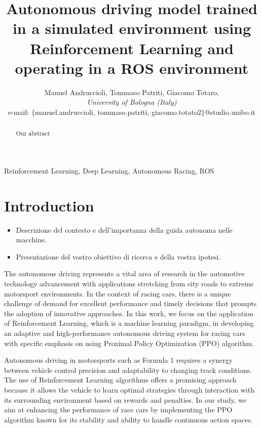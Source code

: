 \documentclass[conference]{IEEEtran}
\begin{document}
\title{
    Autonomous driving model trained in a simulated environment using Reinforcement Learning and operating in a ROS environment
}

\author{Manuel Andruccioli,
Tommaso Patriti,
Giacomo Totaro,\\ 
\textit{University of Bologna (Italy)} \\
e-mail: $\{$manuel.andruccioli, tommaso.patriti, giacomo.totato2$\}$@studio.unibo.it }

\maketitle

\begin{abstract}
Our abstract
\end{abstract}

\begin{IEEEkeywords}
    Reinforcement Learning, Deep Learning, Autonomous Racing, ROS
\end{IEEEkeywords}

\section{Introduction}

\begin{itemize}
    \item Descrizione del contesto e dell'importanza della guida autonoma nelle macchine.

    \item Presentazione del vostro obiettivo di ricerca e della vostra ipotesi.

\end{itemize}

The autonomous driving represents a vital area of research in the automotive technology advancement with applications stretching from city roads to extreme motorsport environments. In the context of racing cars, there is a unique challenge of demand for excellent performance and timely decisions that prompts the adoption of innovative approaches. In this work, we focus on the application of Reinforcement Learning, which is a machine learning paradigm, in developing an adaptive and high-performance autonomous driving system for racing cars with specific emphasis on using Proximal Policy Optimization (PPO) algorithm.

Autonomous driving in motorsports such as Formula 1 requires a synergy between vehicle control precision and adaptability to changing track conditions. The use of Reinforcement Learning algorithms offers a promising approach because it allows the vehicle to learn optimal strategies through interaction with its surrounding environment based on rewards and penalties. In our study, we aim at enhancing the performance of race cars by implementing the PPO algorithm known for its stability and ability to handle continuous action spaces.
\end{document}
